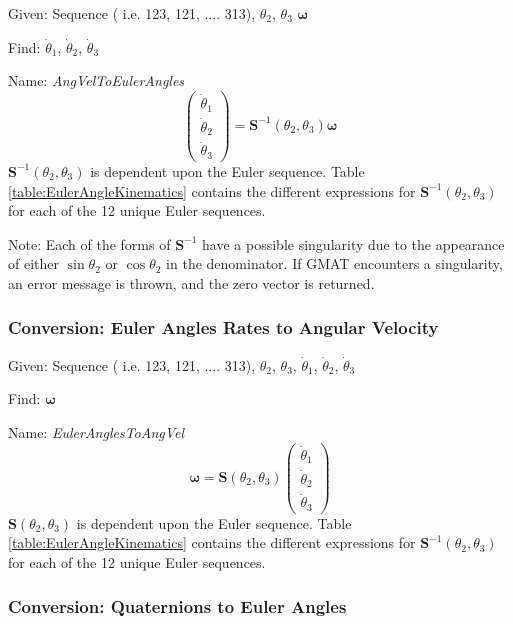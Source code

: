 Given:  Sequence ( i.e. 123, 121, .... 313), $\theta_2$,
$\theta_3$ $\boldsymbol\omega$

\noindent Find: $\dot\theta_1$, $\dot\theta_2$, $\dot\theta_3$

\noindent Name:  \emph{AngVelToEulerAngles}
%
\begin{equation}
    \begin{pmatrix}
         \dot\theta_1\\
         \dot\theta_2\\
         \dot\theta_3
    \end{pmatrix}
    = \mathbf{S}^{-1}(\theta_2,\theta_3)\boldsymbol\omega
\end{equation}
%
$\mathbf{S}^{-1}(\theta_2,\theta_3)$ is dependent upon the Euler
sequence.  Table \ref{table:EulerAngleKinematics} contains the
different expressions for $\mathbf{S}^{-1}(\theta_2,\theta_3)$ for
each of the 12 unique Euler sequences.

Note:  Each of the forms of $\mathbf{S}^{-1}$ have a possible
singularity due to the appearance of either $\sin{\theta_2}$ or
$\cos{\theta_2}$ in the denominator.  If GMAT encounters a
singularity, an error message is thrown, and the zero vector is
returned.

\subsubsection{Conversion:  Euler Angles Rates to Angular Velocity}

\noindent Given: Sequence ( i.e. 123, 121, .... 313), $\theta_2$,
$\theta_3$, $\dot\theta_1$, $\dot\theta_2$, $\dot\theta_3$

\noindent Find: $\boldsymbol\omega$

\noindent Name:  \emph{EulerAnglesToAngVel}
%
\begin{equation}
    \boldsymbol\omega = \mathbf{S}(\theta_2,\theta_3)
        \begin{pmatrix}
         \dot\theta_1\\
         \dot\theta_2\\
         \dot\theta_3
    \end{pmatrix}
\end{equation}
%
$\mathbf{S}(\theta_2,\theta_3)$ is dependent upon the Euler
sequence.  Table \ref{table:EulerAngleKinematics} contains the
different expressions for $\mathbf{S}^{-1}(\theta_2,\theta_3)$ for
each of the 12 unique Euler sequences.

\newpage
\subsubsection{Conversion:  Quaternions to Euler Angles}

